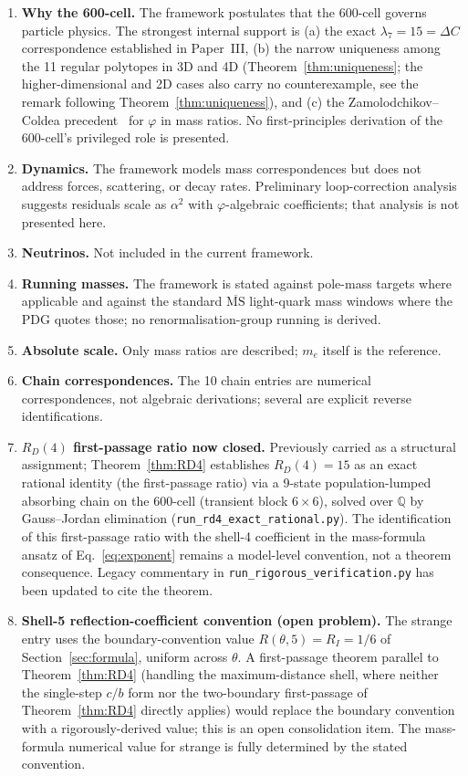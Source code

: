 \documentclass[12pt]{article}
\newcommand{\phig}{\varphi}
\begin{document}
\begin{enumerate}
    \item \textbf{Why the 600-cell.} The framework postulates that the 600-cell governs particle physics. The strongest internal support is (a) the exact $\lambda_7 = 15 = \Delta C$ correspondence established in Paper~III, (b) the narrow uniqueness among the 11 regular polytopes in 3D and 4D (Theorem~\ref{thm:uniqueness}; the higher-dimensional and 2D cases also carry no counterexample, see the remark following Theorem~\ref{thm:uniqueness}), and (c) the Zamolodchikov--Coldea precedent~\citep{Zamolodchikov1989, Coldea2010} for $\phig$ in mass ratios. No first-principles derivation of the 600-cell's privileged role is presented.
    \item \textbf{Dynamics.} The framework models mass correspondences but does not address forces, scattering, or decay rates. Preliminary loop-correction analysis suggests residuals scale as $\alpha^2$ with $\phig$-algebraic coefficients; that analysis is not presented here.
    \item \textbf{Neutrinos.} Not included in the current framework.
    \item \textbf{Running masses.} The framework is stated against pole-mass targets where applicable and against the standard $\overline{\mathrm{MS}}$ light-quark mass windows where the PDG quotes those; no renormalisation-group running is derived.
    \item \textbf{Absolute scale.} Only mass ratios are described; $m_e$ itself is the reference.
    \item \textbf{Chain correspondences.} The 10 chain entries are numerical correspondences, not algebraic derivations; several are explicit reverse identifications.
    \item \textbf{$R_D(4)$ first-passage ratio now closed.} Previously carried as a structural assignment; Theorem~\ref{thm:RD4} establishes $R_D(4) = 15$ as an exact rational identity (the first-passage ratio) via a 9-state population-lumped absorbing chain on the 600-cell (transient block $6 \times 6$), solved over $\mathbb{Q}$ by Gauss--Jordan elimination (\texttt{run\_rd4\_exact\_rational.py}). The identification of this first-passage ratio with the shell-4 coefficient in the mass-formula ansatz of Eq.~\eqref{eq:exponent} remains a model-level convention, not a theorem consequence. Legacy commentary in \texttt{run\_rigorous\_verification.py} has been updated to cite the theorem.
    \item \textbf{Shell-5 reflection-coefficient convention (open problem).} The strange entry uses the boundary-convention value $R(\theta, 5) = R_I = 1/6$ of Section~\ref{sec:formula}, uniform across $\theta$. A first-passage theorem parallel to Theorem~\ref{thm:RD4} (handling the maximum-distance shell, where neither the single-step $c/b$ form nor the two-boundary first-passage of Theorem~\ref{thm:RD4} directly applies) would replace the boundary convention with a rigorously-derived value; this is an open consolidation item. The mass-formula numerical value for strange is fully determined by the stated convention.

\end{enumerate}
\end{document}
